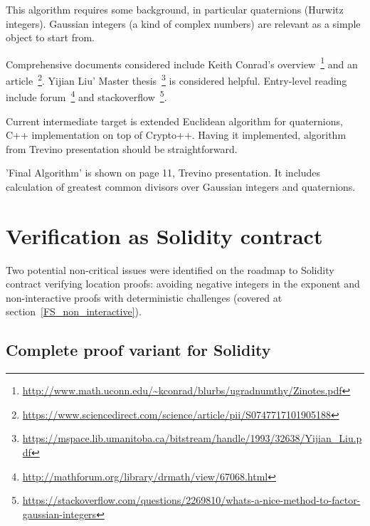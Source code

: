 \documentclass[a4paper,12pt]{article}
\begin{document}
This algorithm requires some background, in particular quaternions (Hurwitz integers).
Gaussian integers (a kind of complex numbers) are relevant as a simple object to start from.

Comprehensive documents considered include
Keith Conrad's overview~\footnote{\url{http://www.math.uconn.edu/~kconrad/blurbs/ugradnumthy/Zinotes.pdf}}
and an article~\footnote{\url{https://www.sciencedirect.com/science/article/pii/S0747717101905188}}.
%
Yijian Liu' Master thesis~\footnote{\url{https://mspace.lib.umanitoba.ca/bitstream/handle/1993/32638/Yijian_Liu.pdf}} is considered helpful.
%
Entry-level reading include
forum~\footnote{\url{http://mathforum.org/library/drmath/view/67068.html}}
and stackoverflow~\footnote{\url{https://stackoverflow.com/questions/2269810/whats-a-nice-method-to-factor-gaussian-integers}}.

Current intermediate target is extended Euclidean algorithm for quaternions, C++ implementation on top of Crypto++.
Having it implemented, algorithm from Trevino presentation should be straightforward.

'Final Algorithm' is shown on page 11, Trevino presentation.
It includes calculation of greatest common divisors over Gaussian integers and quaternions.

\section{Verification as Solidity contract}

Two potential non-critical issues were identified on the roadmap to Solidity contract verifying location proofs:
avoiding negative integers in the exponent and
non-interactive proofs with deterministic challenges (covered at section~\ref{FS_non_interactive}).



\subsection{Complete proof variant for Solidity}
\end{document}
